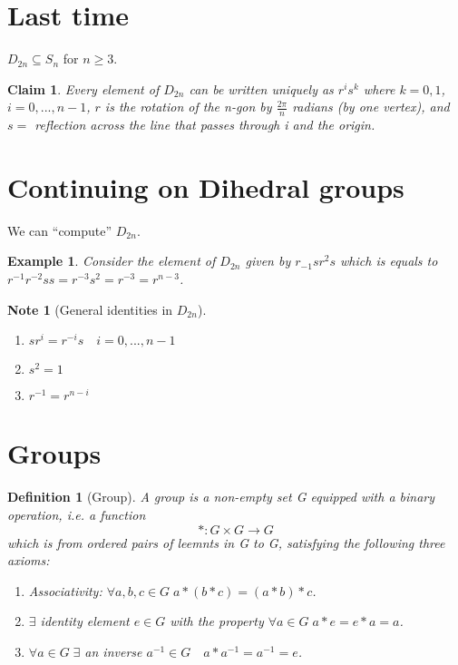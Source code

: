 \documentclass[11pt, oneside]{book}
\theoremstyle{break}
\newtheorem{claim}{Claim}[section]
\newtheorem*{note}{Note}
\newtheorem{defn}{Definition}[section]
\newtheorem{eg}{Example}[section]
\begin{document}
\section{Last time}

$D_{2n} \subseteq S_n$ for $n \geq 3$.

\begin{claim}
    Every element of $D_{2n}$ can be written uniquely as $r^i s^k$ where $k = 0, 1$, $i = 0, ..., n - 1$, $r$ is the rotation of the n-gon by $\frac{2\pi}{n}$ radians (by one vertex), and $s =$ reflection across the line that passes through i and the origin.
\end{claim}

\section{Continuing on Dihedral groups}

We can ``compute'' $D_{2n}$.

\begin{eg}
    Consider the element of $D_{2n}$ given by $r_{-1}sr^2s$ which is equals to $r^{-1}r^{-2}ss = r^{-3}s^2 = r^{-3} = r^{n - 3}$.
\end{eg}

\begin{note}[General identities in $D_{2n}$]
    \begin{enumerate}
        \item $sr^i = r^{-i}s \quad i = 0, ..., n - 1$
        \item $s^2 = 1$
        \item $r^{-1} = r^{n - i}$
    \end{enumerate}
\end{note}

\section{Groups}\label{sect:group_intro}

\begin{defn}[Group]
    A group is a non-empty set G equipped with a binary operation, i.e. a function
    \begin{equation}
        * : G \times G \to G
    \end{equation}
    which is from ordered pairs of leemnts in G to G, satisfying the following three axioms:
    \begin{enumerate}
        \item Associativity: $\forall a, b, c \in G \; a * (b * c) = (a * b) * c$.
        \item $\exists$ identity element $e \in G$ with the property $\forall a \in G \; a * e = e * a = a$.
        \item $\forall a \in G \; \exists $ an inverse $a^{-1} \in G \quad a * a^{-1} = a^{-1} = e$.
    \end{enumerate}
\end{defn}
\end{document}

